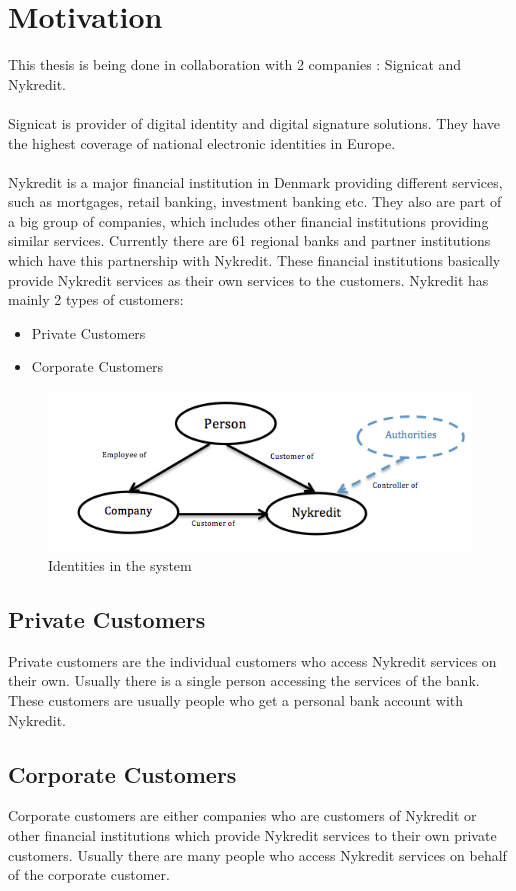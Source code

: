 \section{Motivation}
This thesis is being done in collaboration with 2 companies : Signicat and Nykredit. \\\\Signicat is provider of digital identity and digital signature solutions. They have the highest coverage of national electronic identities in Europe.
\\\\Nykredit is a major financial institution in Denmark providing different services, such as mortgages, retail banking, investment banking etc. They also are part of a big group of companies, which includes other financial institutions providing similar services. Currently there are 61 regional banks and partner institutions which have this partnership with Nykredit. These financial institutions basically provide Nykredit services as their own services to the customers.
Nykredit has mainly 2 types of customers:
\begin{itemize}
\item Private Customers
\item Corporate Customers
\end{itemize}
\begin{figure}[h]
	\centering
	\includegraphics[width=\textwidth]{figures/Customers}
	\caption{Identities in the system}
	\label{fig:Customers}
\end{figure}
\subsection{Private Customers}
Private customers are the individual customers who access Nykredit services on their own. Usually there is a single person accessing the services of the bank. These customers are usually people who get a personal bank account with Nykredit.
\subsection{Corporate Customers}
Corporate customers are either companies who are customers of Nykredit or other financial institutions which provide Nykredit services to their own private customers. Usually there are many people who access Nykredit services on behalf of the corporate customer.
